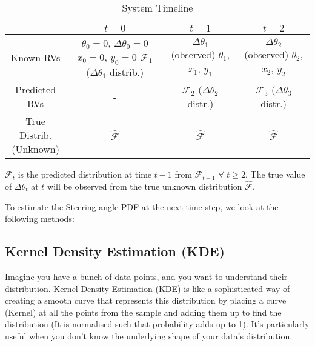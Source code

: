\documentclass[conference]{IEEEtran}
\begin{document}
\begin{table}[h!]
    \centering
    \renewcommand{\arraystretch}{1.75} %
    \small  %
    \begin{tabular}{|c|c|c|c|}
        \hline
        & $t=0$ & $t=1$ & $t=2$ \\
        \hline
        Known RVs & \parbox[c]{2.25cm}{\centering $\theta_0=0$, $\Delta \theta_0 = 0$ \\ $x_0=0$, $y_0=0$ \\ $\mathcal{F}_{1}$ $(\Delta \theta_1$ distrib.)}  & \parbox[c]{2.35cm}{\centering $\Delta \theta_1$ (observed) \\ $\theta_1$, $x_1$, $y_1$} & \parbox[c]{2.35cm}{\centering $\Delta \theta_2$ (observed) \\ $\theta_2$, $x_2$, $y_2$} \\
        \hline
        Predicted RVs & - & $\mathcal{F}_{2}$ $(\Delta \theta_2$ distr.) & $\mathcal{F}_{3}$ $(\Delta \theta_3$ distr.) \\
        \hline
        \parbox[c]{1.8cm}{\centering True Distrib.\\ (Unknown)} & $\hat{\mathcal{F}}$ & $\hat{\mathcal{F}}$ & $\hat{\mathcal{F}}$ \\
        \hline
    \end{tabular}
    \vspace{0.2cm}  %
    \caption{System Timeline}
    \raggedright
    $\mathcal{F}_{t}$ is the predicted distribution at time $t-1$ from $\mathcal{F}_{t-1}$ $\forall$ $t \geq 2$. The true value of $\Delta \theta_t$ at $t$ will be observed from the true unknown distribution $\hat{\mathcal{F}}$.
    \label{tab:sample_table}
\end{table}

To estimate the Steering angle PDF at the next time step, we look at the following methods:
\subsection{Kernel Density Estimation (KDE)}
Imagine you have a bunch of data points, and you want
to understand their distribution. Kernel Density Estimation
(KDE) is like a sophisticated way of creating a smooth
curve that represents this distribution by placing a curve (Kernel) at all the points from the sample and adding them up to find the distribution (It is normalised such that probability adds up to 1). It’s particularly useful when you don’t know the underlying shape of your data’s distribution.
\end{document}
